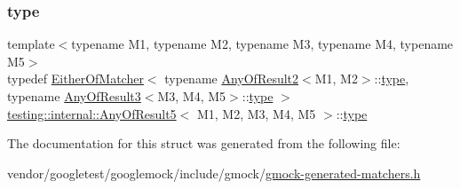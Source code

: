 \subsubsection{\texorpdfstring{type}{type}}
{\footnotesize\ttfamily template$<$typename M1, typename M2, typename M3, typename M4, typename M5$>$ \\
typedef \hyperlink{classtesting_1_1internal_1_1_either_of_matcher}{Either\+Of\+Matcher}$<$ typename \hyperlink{structtesting_1_1internal_1_1_any_of_result2}{Any\+Of\+Result2}$<$M1, M2$>$\+::\hyperlink{structtesting_1_1internal_1_1_any_of_result5_a459a06dc5791313dce942668714f0c99}{type}, typename \hyperlink{structtesting_1_1internal_1_1_any_of_result3}{Any\+Of\+Result3}$<$M3, M4, M5$>$\+::\hyperlink{structtesting_1_1internal_1_1_any_of_result5_a459a06dc5791313dce942668714f0c99}{type} $>$ \hyperlink{structtesting_1_1internal_1_1_any_of_result5}{testing\+::internal\+::\+Any\+Of\+Result5}$<$ M1, M2, M3, M4, M5 $>$\+::\hyperlink{structtesting_1_1internal_1_1_any_of_result5_a459a06dc5791313dce942668714f0c99}{type}}



The documentation for this struct was generated from the following file\+:\begin{DoxyCompactItemize}
\item 
vendor/googletest/googlemock/include/gmock/\hyperlink{gmock-generated-matchers_8h}{gmock-\/generated-\/matchers.\+h}\end{DoxyCompactItemize}
